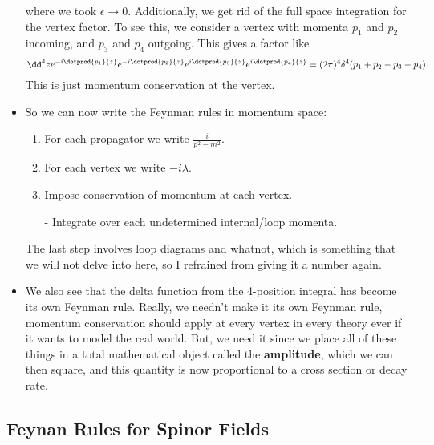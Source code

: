 \begin{itemize}
        where we took $\epsilon \rightarrow 0$. Additionally, we get rid of the full space integration for the vertex factor. To see this, we consider a vertex with momenta $p_1$ and $p_2$ incoming, and $p_3$ and $p_4$ outgoing. This gives a factor like
        \begin{equation*}
            \dd^4z e^{-i\dotprod{p_1}{z}}e^{-i\dotprod{p_2}{z}}e^{i\dotprod{p_3}{z}}e^{i\dotprod{p_4}{z}} = (2\pi)^4\delta^4(p_1 + p_2 - p_3 - p_4).
        \end{equation*}
        This is just momentum conservation at the vertex.
    \item So we can now write the Feynman rules in momentum space:
        \begin{enumerate}
            \item For each propagator we write $\frac{i}{p^2-m^2}$.
            \item For each vertex we write $-i\lambda$.
            \item Impose conservation of momentum at each vertex.
            \item[-] Integrate over each undetermined internal/loop momenta.
        \end{enumerate}
        The last step involves loop diagrams and whatnot, which is something that we will not delve into here, so I refrained from giving it a number again.
    \item We also see that the delta function from the 4-position integral has become its own Feynman rule. Really, we needn't make it its own Feynman rule, momentum conservation should apply at every vertex in every theory ever if it wants to model the real world. But, we need it since we place all of these things in a total mathematical object called the \textbf{amplitude}, which we can then square, and this quantity is now proportional to a cross section or decay rate.
    
\end{itemize}




\subsection*{Feynan Rules for Spinor Fields}

